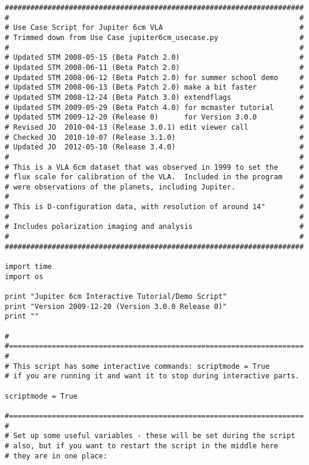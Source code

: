 \small
\begin{verbatim}
######################################################################
#                                                                    #
# Use Case Script for Jupiter 6cm VLA                                #
# Trimmed down from Use Case jupiter6cm_usecase.py                   #
#                                                                    #
# Updated STM 2008-05-15 (Beta Patch 2.0)                            #
# Updated STM 2008-06-11 (Beta Patch 2.0)                            #
# Updated STM 2008-06-12 (Beta Patch 2.0) for summer school demo     #
# Updated STM 2008-06-13 (Beta Patch 2.0) make a bit faster          #
# Updated STM 2008-12-24 (Beta Patch 3.0) extendflags                #
# Updated STM 2009-05-29 (Beta Patch 4.0) for mcmaster tutorial      #
# Updated STM 2009-12-20 (Release 0)      for Version 3.0.0          #
# Revised JO  2010-04-13 (Release 3.0.1) edit viewer call            #
# Checked JO  2010-10-07 (Release 3.1.0)                             #
# Updated JO  2012-05-10 (Release 3.4.0)                             #
#                                                                    #
# This is a VLA 6cm dataset that was observed in 1999 to set the     #
# flux scale for calibration of the VLA.  Included in the program    #
# were observations of the planets, including Jupiter.               #
#                                                                    #
# This is D-configuration data, with resolution of around 14"        #
#                                                                    #
# Includes polarization imaging and analysis                         #
#                                                                    #
######################################################################

import time
import os

print "Jupiter 6cm Interactive Tutorial/Demo Script"
print "Version 2009-12-20 (Version 3.0.0 Release 0)"
print ""

# 
#=====================================================================
#
# This script has some interactive commands: scriptmode = True
# if you are running it and want it to stop during interactive parts.

scriptmode = True

#=====================================================================
#
# Set up some useful variables - these will be set during the script
# also, but if you want to restart the script in the middle here
# they are in one place:


\end{verbatim}
